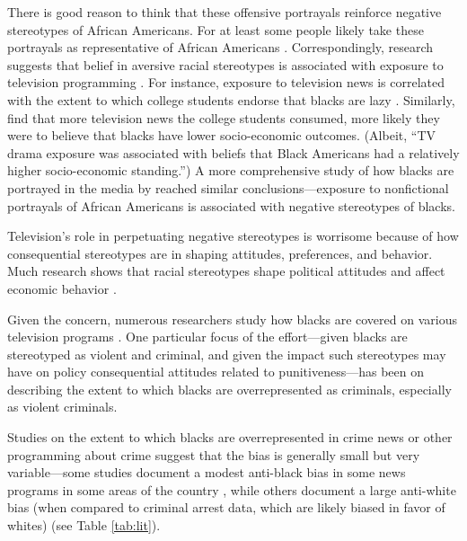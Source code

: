 \documentclass[12pt, letterpaper]{article}
\begin{document}
There is good reason to think that these offensive portrayals reinforce negative stereotypes of African Americans. For at least some people likely take these portrayals as representative of African Americans \citep[see][]{punyanunt2008perceived}. Correspondingly, research suggests that belief in aversive racial stereotypes is associated with exposure to television programming \citep{busselle2002television, entman2001black, armstrong1992tv}. For instance, exposure to television news is correlated with the extent to which college students endorse that blacks are lazy \citep{busselle2002television}. Similarly, \citet{armstrong1992tv} find that more television news the college students consumed, more likely they were to believe that blacks have lower socio-economic outcomes. (Albeit, ``TV drama exposure was associated with beliefs that Black Americans had a relatively higher socio-economic standing.'') A more comprehensive study of how blacks are portrayed in the media by \citet{entman2001black} reached similar conclusions---exposure to nonfictional portrayals of African Americans is associated with negative stereotypes of blacks.

Television's role in perpetuating negative stereotypes is worrisome because of how consequential stereotypes are in shaping attitudes, preferences, and behavior. Much research shows that racial stereotypes shape political attitudes \citep[see, for e.g.,][]{sniderman1995scar, hurwitz1997public, peffley1997racial, dixon2006psychological} and affect economic behavior \citep[see, for e.g.,][]{bertrand2004emily}.

Given the concern, numerous researchers study how blacks are covered on various television programs \citep[for e.g.,][]{entman2001black, eschholz2004images}. One particular focus of the effort---given blacks are stereotyped as violent and criminal, and given the impact such stereotypes may have on policy consequential attitudes related to punitiveness---has been on describing the extent to which blacks are overrepresented as criminals, especially as violent criminals. 

Studies on the extent to which blacks are overrepresented in crime news or other programming about crime suggest that the bias is generally small but very variable---some studies document a modest anti-black bias in some news programs in some areas of the country \citep{gilliam1996crime}, while others document a large anti-white bias (when compared to criminal arrest data, which are likely biased in favor of whites) \citep{chiricos2002racial, dixon2000overrepresentation, eschholz2004images} (see Table \ref{tab:lit}). 
\end{document}

